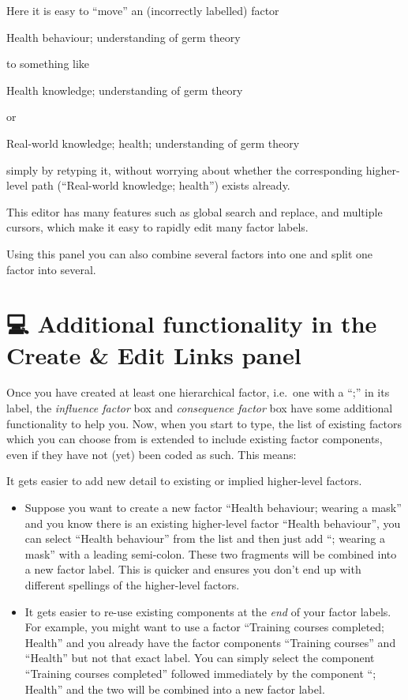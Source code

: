 \documentclass[
]{book}
\begin{document}
Here it is easy to ``move'' an (incorrectly labelled) factor

Health behaviour; understanding of germ theory

to something like

Health knowledge; understanding of germ theory

or

Real-world knowledge; health; understanding of germ theory

simply by retyping it, without worrying about whether the corresponding higher-level path (``Real-world knowledge; health'') exists already.

This editor has many features such as global search and replace, and multiple cursors, which make it easy to rapidly edit many factor labels.

Using this panel you can also combine several factors into one and split one factor into several.

\hypertarget{additional-functionality-in-the-create-edit-links-panel}{%
\section{💻 Additional functionality in the Create \& Edit Links panel}\label{additional-functionality-in-the-create-edit-links-panel}}

Once you have created at least one hierarchical factor, i.e.~one with a ``;'' in its label, the \emph{influence factor} box and \emph{consequence factor} box have some additional functionality to help you. Now, when you start to type, the list of existing factors which you can choose from is extended to include existing factor components, even if they have not (yet) been coded as such. This means:

It gets easier to add new detail to existing or implied higher-level factors.

\begin{itemize}
\item
  Suppose you want to create a new factor ``Health behaviour; wearing a mask'' and you know there is an existing higher-level factor ``Health behaviour'', you can select ``Health behaviour'' from the list and then just add ``; wearing a mask'' with a leading semi-colon. These two fragments will be combined into a new factor label. This is quicker and ensures you don't end up with different spellings of the higher-level factors.
\item
  It gets easier to re-use existing components at the \emph{end} of your factor labels. For example, you might want to use a factor ``Training courses completed; Health'' and you already have the factor components ``Training courses'' and ``Health'' but not that exact label. You can simply select the component ``Training courses completed'' followed immediately by the component ``; Health'' and the two will be combined into a new factor label.
\end{itemize}
\end{document}
